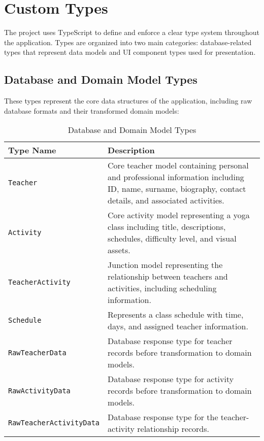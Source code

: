 \section{Custom Types}

The project uses TypeScript to define and enforce a clear type system throughout the application. Types are organized into two main categories: database-related types that represent data models and UI component types used for presentation.

\subsection{Database and Domain Model Types}

These types represent the core data structures of the application, including raw database formats and their transformed domain models:

\begin{table}[H]
    \centering
    \begin{tabular}{|p{4.5cm}|p{9.5cm}|}
        \hline
        \rowcolor{bluepoli!20}
        \textbf{Type Name} & \textbf{Description} \\
        \hline
        \texttt{Teacher} & Core teacher model containing personal and professional information including ID, name, surname, biography, contact details, and associated activities. \\
        \hline
        \texttt{Activity} & Core activity model representing a yoga class including title, descriptions, schedules, difficulty level, and visual assets. \\
        \hline
        \texttt{TeacherActivity} & Junction model representing the relationship between teachers and activities, including scheduling information. \\
        \hline
        \texttt{Schedule} & Represents a class schedule with time, days, and assigned teacher information. \\
        \hline
        \texttt{RawTeacherData} & Database response type for teacher records before transformation to domain models. \\
        \hline
        \texttt{RawActivityData} & Database response type for activity records before transformation to domain models. \\
        \hline
        \texttt{RawTeacher\-ActivityData} & Database response type for the teacher-activity relationship records. \\
        \hline
    \end{tabular}
    \caption{Database and Domain Model Types}
\end{table}

